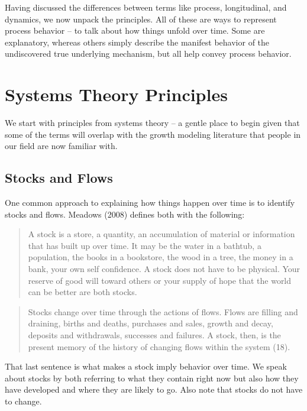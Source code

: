 \documentclass[english,,man]{apa6}
\theoremstyle{definition}
\theoremstyle{definition}
\theoremstyle{definition}
\theoremstyle{remark}
\begin{document}
Having discussed the differences between terms like process,
longitudinal, and dynamics, we now unpack the principles. All of these
are ways to represent process behavior -- to talk about how things
unfold over time. Some are explanatory, whereas others simply describe
the manifest behavior of the undiscovered true underlying mechanism, but
all help convey process behavior.

\hypertarget{systems-theory-principles}{%
\section{Systems Theory Principles}\label{systems-theory-principles}}

We start with principles from systems theory -- a gentle place to begin
given that some of the terms will overlap with the growth modeling
literature that people in our field are now familiar with.

\hypertarget{stocks-and-flows}{%
\subsection{Stocks and Flows}\label{stocks-and-flows}}

One common approach to explaining how things happen over time is to
identify stocks and flows. Meadows (2008) defines both with the
following:

\begin{quote}
A stock is a store, a quantity, an accumulation of material or
information that has built up over time. It may be the water in a
bathtub, a population, the books in a bookstore, the wood in a tree, the
money in a bank, your own self confidence. A stock does not have to be
physical. Your reserve of good will toward others or your supply of hope
that the world can be better are both stocks.
\end{quote}

\begin{quote}
Stocks change over time through the actions of flows. Flows are filling
and draining, births and deaths, purchases and sales, growth and decay,
deposits and withdrawals, successes and failures. A stock, then, is the
present memory of the history of changing flows within the system (18).
\end{quote}

\noindent That last sentence is what makes a stock imply behavior over
time. We speak about stocks by both referring to what they contain right
now but also how they have developed and where they are likely to go.
Also note that stocks do not have to change.
\end{document}
